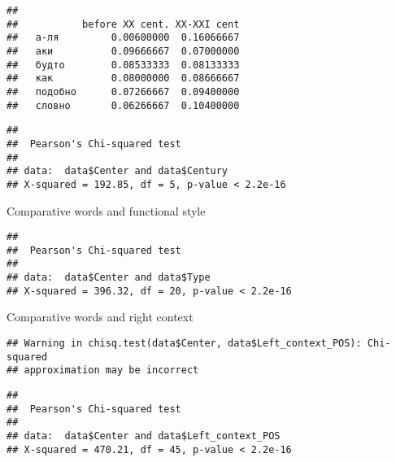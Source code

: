 \documentclass[
]{article}
\newenvironment{Shaded}{\begin{snugshade}}{\end{snugshade}}
\newcommand{\KeywordTok}[1]{\textcolor[rgb]{0.13,0.29,0.53}{\textbf{#1}}}
\newcommand{\NormalTok}[1]{#1}
\newcommand{\OperatorTok}[1]{\textcolor[rgb]{0.81,0.36,0.00}{\textbf{#1}}}
\begin{document}
\begin{verbatim}
##          
##           before XX cent. XX-XXI cent
##   а-ля         0.00600000  0.16066667
##   аки          0.09666667  0.07000000
##   будто        0.08533333  0.08133333
##   как          0.08000000  0.08666667
##   подобно      0.07266667  0.09400000
##   словно       0.06266667  0.10400000
\end{verbatim}

\begin{Shaded}
\end{Shaded}

\begin{verbatim}
## 
##  Pearson's Chi-squared test
## 
## data:  data$Center and data$Century
## X-squared = 192.85, df = 5, p-value < 2.2e-16
\end{verbatim}

Comparative words and functional style

\begin{Shaded}
\end{Shaded}

\begin{verbatim}
## 
##  Pearson's Chi-squared test
## 
## data:  data$Center and data$Type
## X-squared = 396.32, df = 20, p-value < 2.2e-16
\end{verbatim}

Comparative words and right context

\begin{Shaded}
\end{Shaded}

\begin{verbatim}
## Warning in chisq.test(data$Center, data$Left_context_POS): Chi-squared
## approximation may be incorrect
\end{verbatim}

\begin{verbatim}
## 
##  Pearson's Chi-squared test
## 
## data:  data$Center and data$Left_context_POS
## X-squared = 470.21, df = 45, p-value < 2.2e-16
\end{verbatim}
\end{document}
